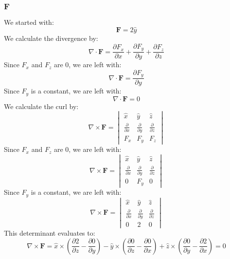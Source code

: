 \documentclass{article}
\begin{document}
\subsubsection{$\mathbf{F}$}
We started with:
\begin{equation}
    \mathbf{F}=2\hat{y}
\end{equation}
We calculate the divergence by:
\begin{equation}
    \nabla \cdot \mathbf{F} = \frac{\partial F_x}{\partial x} + \frac{\partial F_y}{\partial y} + \frac{\partial F_z}{\partial z}
\end{equation}
Since $F_x$ and $F_z$ are 0, we are left with:
\begin{equation}
    \nabla \cdot \mathbf{F} = \frac{\partial F_y}{\partial y}
\end{equation}
Since $F_y$ is a constant, we are left with:
\begin{equation}
    \nabla \cdot \mathbf{F} = 0
\end{equation}
We calculate the curl by:
\begin{equation}
    \nabla \times \mathbf{F} = \begin{vmatrix}
    \hat{x} & \hat{y} & \hat{z}\\
    \frac{\partial}{\partial x} & \frac{\partial}{\partial y} & \frac{\partial}{\partial z}\\
    F_x & F_y & F_z
    \end{vmatrix}
\end{equation}
Since $F_x$ and $F_z$ are 0, we are left with:
\begin{equation}
    \nabla \times \mathbf{F} = \begin{vmatrix}
    \hat{x} & \hat{y} & \hat{z}\\
    \frac{\partial}{\partial x} & \frac{\partial}{\partial y} & \frac{\partial}{\partial z}\\
    0 & F_y & 0
    \end{vmatrix}
\end{equation}
Since $F_y$ is a constant, we are left with:
\begin{equation}
    \nabla \times \mathbf{F} = \begin{vmatrix}
    \hat{x} & \hat{y} & \hat{z}\\
    \frac{\partial}{\partial x} & \frac{\partial}{\partial y} & \frac{\partial}{\partial z}\\
    0 & 2 & 0
    \end{vmatrix}
\end{equation}
This determinant evaluates to:
\begin{equation}
    \nabla \times \mathbf{F} = \hat{x}\times\left(\frac{\partial 2}{\partial z}-\frac{\partial 0}{\partial y}\right) - \hat{y}\times\left(\frac{\partial 0}{\partial z}-\frac{\partial 0}{\partial x}\right) + \hat{z}\times\left(\frac{\partial 0}{\partial y}-\frac{\partial 2}{\partial x}\right)=0
\end{equation}
\end{document}
